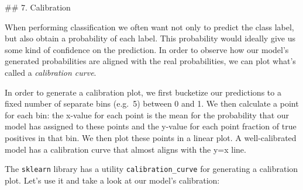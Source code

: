 \documentclass[11pt]{article}
\begin{document}
     \#\# 7. Calibration

    When performing classification we often want not only to predict the
class label, but also obtain a probability of each label. This
probability would ideally give us some kind of confidence on the
prediction. In order to observe how our model's generated probabilities
are aligned with the real probabilities, we can plot what's called a
\emph{calibration curve}.

In order to generate a calibration plot, we first bucketize our
predictions to a fixed number of separate bins (e.g.~5) between 0 and 1.
We then calculate a point for each bin: the x-value for each point is
the mean for the probability that our model has assigned to these points
and the y-value for each point fraction of true positives in that bin.
We then plot these points in a linear plot. A well-calibrated model has
a calibration curve that almost aligns with the y=x line.

The \texttt{sklearn} library has a utility \texttt{calibration\_curve}
for generating a calibration plot. Let's use it and take a look at our
model's calibration:
\end{document}
